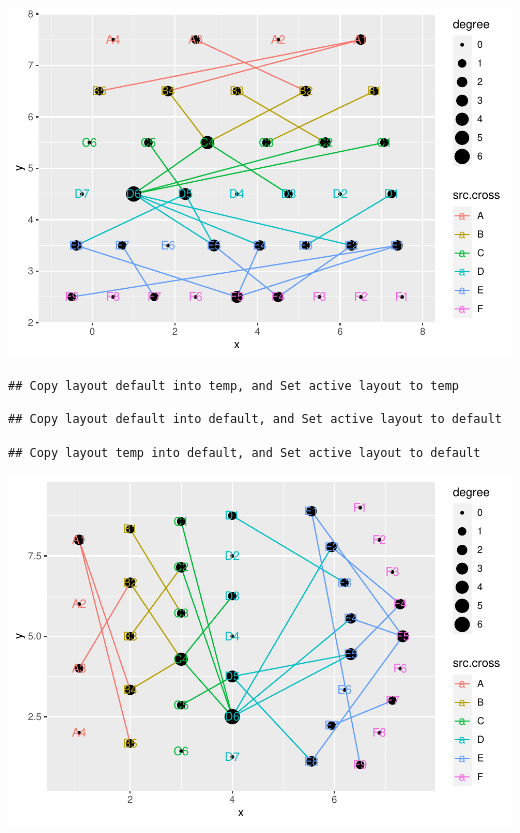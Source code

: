 \documentclass[
]{article}
\newenvironment{Shaded}{\begin{snugshade}}{\end{snugshade}}
\newcommand{\CommentTok}[1]{\textcolor[rgb]{0.56,0.35,0.01}{\textit{#1}}}
\newcommand{\DataTypeTok}[1]{\textcolor[rgb]{0.13,0.29,0.53}{#1}}
\newcommand{\DecValTok}[1]{\textcolor[rgb]{0.00,0.00,0.81}{#1}}
\newcommand{\KeywordTok}[1]{\textcolor[rgb]{0.13,0.29,0.53}{\textbf{#1}}}
\newcommand{\NormalTok}[1]{#1}
\newcommand{\OperatorTok}[1]{\textcolor[rgb]{0.81,0.36,0.00}{\textbf{#1}}}
\newcommand{\StringTok}[1]{\textcolor[rgb]{0.31,0.60,0.02}{#1}}
\begin{document}
\includegraphics{ReadMe1_files/figure-latex/unnamed-chunk-7-3.pdf}

\begin{Shaded}
\end{Shaded}

\begin{verbatim}
## Copy layout default into temp, and Set active layout to temp
\end{verbatim}

\begin{verbatim}
## Copy layout default into default, and Set active layout to default
\end{verbatim}

\begin{verbatim}
## Copy layout temp into default, and Set active layout to default
\end{verbatim}

\includegraphics{ReadMe1_files/figure-latex/unnamed-chunk-7-4.pdf}
\end{document}
